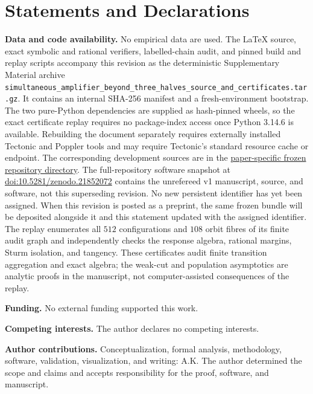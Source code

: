 \documentclass[11pt]{article}
\theoremstyle{definition}
\theoremstyle{remark}
\begin{document}
\section*{Statements and Declarations}

\noindent\textbf{Data and code availability.}
No empirical data are used.  The LaTeX source, exact symbolic and rational
verifiers, labelled-chain audit, and pinned build and replay scripts accompany
this revision as the deterministic Supplementary Material archive
\nolinkurl{simultaneous_amplifier_beyond_three_halves_source_and_certificates.tar.gz}.
It contains an internal SHA-256 manifest and a fresh-environment bootstrap.
The two pure-Python dependencies are supplied as hash-pinned wheels, so the
exact certificate replay requires no package-index access once Python 3.14.6
is available.  Rebuilding the document separately requires externally
installed Tectonic and Poppler tools and may require Tectonic's standard
resource cache or endpoint.
The corresponding development sources are in the
\href{https://github.com/AlecKriebel/Math/tree/simultaneous-amplification-beyond-three-halves-v2.0.3/universal_simultaneous_amplification/phase4_landmark_closure/paper_hybrid_threshold}{paper-specific frozen repository directory}.
The full-repository software snapshot at
\href{https://doi.org/10.5281/zenodo.21852072}{doi:10.5281/zenodo.21852072}
contains the unrefereed v1
manuscript, source, and software, not this superseding revision.  No new
persistent identifier has yet been assigned.  When this revision is posted
as a preprint, the same frozen bundle will be deposited alongside it and this
statement updated with the assigned identifier.
The replay enumerates all $512$ configurations and $108$ orbit fibres of its
finite audit graph and independently checks the response algebra, rational
margins, Sturm isolation, and tangency.  These certificates audit finite
transition aggregation and exact algebra; the weak-cut and population
asymptotics are analytic proofs in the manuscript, not computer-assisted
consequences of the replay.

\medskip
\noindent\textbf{Funding.}
No external funding supported this work.

\medskip
\noindent\textbf{Competing interests.}
The author declares no competing interests.

\medskip
\noindent\textbf{Author contributions.}
Conceptualization, formal analysis, methodology, software, validation,
visualization, and writing: A.K.  The author determined the scope and claims
and accepts responsibility for the proof, software, and manuscript.
\end{document}
